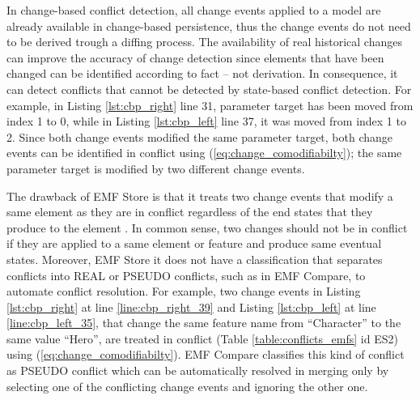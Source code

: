In change-based conflict detection, all change events applied to a model are already available in change-based persistence, thus the change events do not need to be derived trough a diffing process. The availability of real historical changes can improve the accuracy of change detection since elements that have been changed can be identified according to fact -- not derivation. In consequence, it can detect conflicts that cannot be detected by state-based conflict detection. For example, in Listing \ref{lst:cbp_right} line 31, parameter \textsf{target} has been moved from index 1 to 0, while in Listing \ref{lst:cbp_left} line 37, it was moved from index 1 to 2. Since both change events modified the same parameter \textsf{target}, both change events can be identified in conflict using (\ref{eq:change_comodifiabilty}); the same parameter \textsf{target} is modified by two different change events. 


The drawback of EMF Store is that it treats two change events that modify a same element as they are in conflict regardless of the end states that they produce to the element \cite{DBLP:conf/sfm/BroschKLSWW12}. In common sense, two changes should not be in conflict if they are applied to a same element or feature and produce same eventual states. Moreover, EMF Store it does not have a classification that separates conflicts into \textsf{REAL} or \textsf{PSEUDO} conflicts, such as in EMF Compare, to automate conflict resolution. For example, two change events in Listing \ref{lst:cbp_right} at line \ref{line:cbp_right_39} and Listing \ref{lst:cbp_left} at line \ref{line:cbp_left_35}, that change the same feature \textsf{name} from ``Character'' to the same value ``Hero'', are treated in conflict (Table \ref{table:conflicts_emfs} id ES2) using (\ref{eq:change_comodifiabilty}). EMF Compare classifies this kind of conflict as \textsf{PSEUDO} conflict which can be automatically resolved in merging only by selecting one of the conflicting change events and ignoring the other one.

